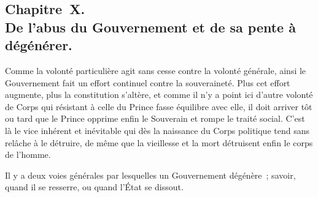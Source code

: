 \documentclass[french,twoside]{book} %
\begin{document}
\subsection[{Chapitre X. De l’abus du Gouvernement et de sa pente à dégénérer.}]{Chapitre X. \\
De l’abus du Gouvernement et de sa pente à dégénérer.}
\noindent Comme la volonté particulière agit sans cesse contre la volonté générale, ainsi le Gouvernement fait un effort continuel contre la souveraineté. Plus cet effort augmente, plus la constitution s’altère, et comme il n’y a point ici d’autre volonté de Corps qui résistant à celle du Prince fasse équilibre avec elle, il doit arriver tôt ou tard que le Prince opprime enfin le Souverain et rompe le traité social. C’est là le vice inhérent et inévitable qui dès la naissance du Corps politique tend sans relâche à le détruire, de même que la vieillesse et la mort détruisent enfin le corps de l’homme.\par
Il y a deux voies générales par lesquelles un Gouvernement dégénère ; savoir, quand il se resserre, ou quand l’État se dissout.\par
\end{document}
